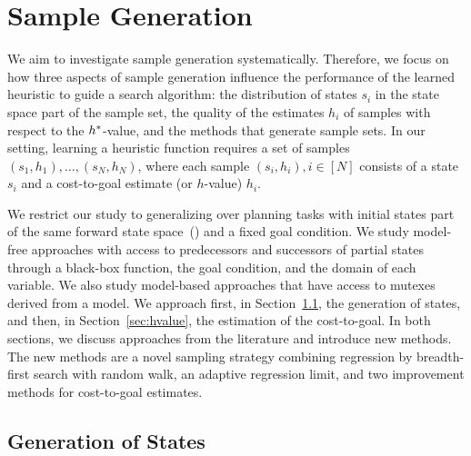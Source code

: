 \chapter{Sample Generation}
\label{sec:sampling}


We aim to investigate sample generation systematically. Therefore, we focus on how three aspects of sample generation influence the performance of the learned heuristic to guide a search algorithm: the distribution of states $s_i$ in the state space part of the sample set, the quality of the estimates $h_i$ of samples with respect to the $h^{*}$-value, and the methods that generate sample sets. In our setting, learning a heuristic function requires a set of samples $(s_1,h_1),\ldots,(s_N,h_N)$, where each sample $(s_i,h_i), i\in[N]$ consists of a state $s_i$ and a cost-to-goal estimate (or $h$-value) $h_i$.

We restrict our study to generalizing over planning tasks with initial states part of the same forward state space~(\fssp) and a fixed goal condition. We study model-free approaches with access to predecessors and successors of partial states through a black-box function, the goal condition, and the domain of each variable. We also study model-based approaches that have access to mutexes derived from a \sas model. We approach first, in Section~\ref{sec:generation}, the generation of states, and then, in Section~\ref{sec:hvalue}, the estimation of the cost-to-goal. In both sections, we discuss approaches from the literature and introduce new methods. The new methods are a novel sampling strategy combining regression by breadth-first search with random walk, an adaptive regression limit, and two improvement methods for cost-to-goal estimates.

\section{Generation of States}
\label{sec:generation}

